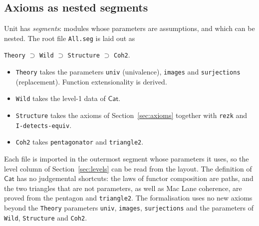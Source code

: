 \documentclass[11pt]{amsart}
\numberwithin{equation}{section}
\theoremstyle{definition}
\theoremstyle{remark}
\newcommand{\code}[1]{\texttt{#1}}
\newcommand{\Cat}{\mathsf{Cat}}
\begin{document}
\subsection{Axioms as nested segments}
Unit has \emph{segments}: modules whose parameters are assumptions,
and which can be nested. The root file \code{All.seg} is laid out as
\begin{center}
\code{Theory} $\supset$ \code{Wild} $\supset$ \code{Structure}
$\supset$ \code{Coh2}.
\end{center}
\begin{itemize}
\item \code{Theory} takes the parameters \code{univ} (univalence),
  \code{images} and \code{surjections} (replacement). Function
  extensionality is derived.
\item \code{Wild} takes the level-1 data of $\Cat$.
\item \code{Structure} takes the axioms of Section~\ref{sec:axioms}
  together with \code{rezk} and \code{I-detects-equiv}.
\item \code{Coh2} takes \code{pentagonator} and \code{triangle2}.
\end{itemize}
Each file is imported in the outermost segment whose parameters it
uses, so the level column of Section~\ref{sec:levels} can be read from
the layout. The definition of $\Cat$ has no judgemental shortcuts: the
laws of functor composition are paths, and the two triangles that are
not parameters, as well as Mac Lane coherence, are proved from the
pentagon and \code{triangle2}. The
formalisation uses no new axioms beyond the \code{Theory} parameters
\code{univ}, \code{images}, \code{surjections} and the parameters of
\code{Wild}, \code{Structure} and \code{Coh2}.
\end{document}
